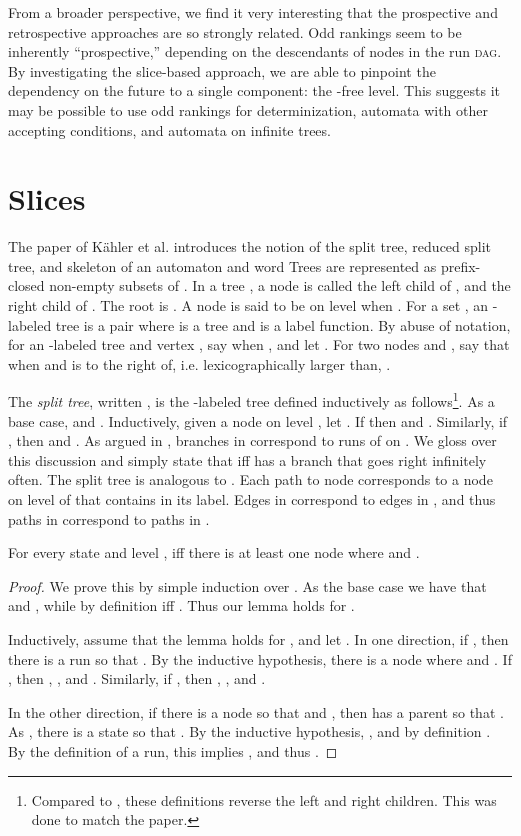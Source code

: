 \documentclass{LMCS}
\newcommand\kahler{K\"ahler\xspace}
\newcommand{\DAG}{\textsc{dag}\xspace}
\begin{document}
From a broader perspective, we find it very interesting that the prospective and retrospective
approaches are so strongly related. Odd rankings seem to be inherently ``prospective,'' depending on
the descendants of nodes in the run \DAG. By investigating the slice-based approach, we are able to
pinpoint the dependency on the future to a single component: the -free level. This suggests it
may be possible to use odd rankings for determinization, automata with other accepting conditions,
and automata on infinite trees.




\newpage
\appendix

\section{Slices}\label{App:Slices}

The paper of \kahler et al. introduces the notion of the split tree, reduced
split tree, and skeleton of an automaton  and word 
 Trees are represented as
prefix-closed non-empty subsets of .  In a tree , a node 
is called the left child of , and  the right child of . The root is
. A node  is said to be on level  when . For a set
, an -labeled tree is a pair  where  is a tree and  is a label function. By abuse of notation, for an -labeled tree
 and vertex , say  when , and let
. For two nodes  and , say that  when
 and  is to the right of, i.e. lexicographically larger
than, .

The \emph{split tree}, written , is the -labeled tree defined
inductively as follows\footnote{Compared to \cite{KW08}, these definitions 
reverse the left and right children.  This was done to match 
the paper.}.  As a base case,  and
.  Inductively, given a node  on level , let
.  If  then  and .  Similarly, if , then  and .  As argued in \cite{KW08}, branches in  correspond to runs of 
on .  We gloss over this discussion and simply state that  iff
 has a branch that goes right infinitely often. 
The split tree is analogous to . Each path  to node  corresponds to a node  on level  of  that contains  in
its label. Edges in  correspond to edges in , and thus paths in
 correspond to paths in .

\begin{lem}\label{Split_Nodes_Correspond}
For every state  and level ,  iff there is at least one node  where  and .
\end{lem}
\begin{proof}
We prove this by simple induction over . As the base case we have that 
and , while by definition  iff . Thus our
lemma holds for .

Inductively, assume that the lemma holds for , and let . In one direction, if
, then there is a run  so that . By the inductive hypothesis,
there is a node  where  and .  If , then
, , and .  Similarly, if , then , , and .

In the other direction, if there is a node  so that  and , then  has a parent  so that . As  , there
is a state  so that . By the inductive hypothesis, , and by definition . By the definition of a run,
this implies , and thus .
\end{proof}
\end{document}
